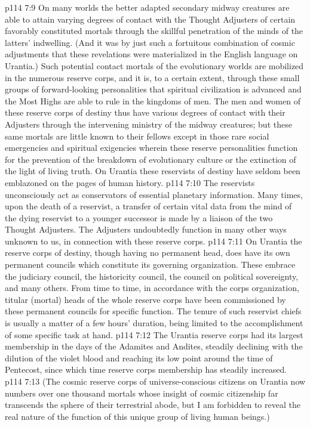 \vs p114 7:9 On many worlds the better adapted secondary midway creatures are able to attain varying degrees of contact with the Thought Adjusters of certain favorably constituted mortals through the skillful penetration of the minds of the latters’ indwelling. (And it was by just such a fortuitous combination of cosmic adjustments that these revelations were materialized in the English language on Urantia.) Such potential contact mortals of the evolutionary worlds are mobilized in the numerous reserve corps, and it is, to a certain extent, through these small groups of forward\hyp{}looking personalities that spiritual civilization is advanced and the Most Highs are able to rule in the kingdoms of men. The men and women of these reserve corps of destiny thus have various degrees of contact with their Adjusters through the intervening ministry of the midway creatures; but these same mortals are little known to their fellows except in those rare social emergencies and spiritual exigencies wherein these reserve personalities function for the prevention of the breakdown of evolutionary culture or the extinction of the light of living truth. On Urantia these reservists of destiny have seldom been emblazoned on the pages of human history.
\vs p114 7:10 The reservists unconsciously act as conservators of essential planetary information. Many times, upon the death of a reservist, a transfer of certain vital data from the mind of the dying reservist to a younger successor is made by a liaison of the two Thought Adjusters. The Adjusters undoubtedly function in many other ways unknown to us, in connection with these reserve corps.
\vs p114 7:11 On Urantia the reserve corps of destiny, though having no permanent head, does have its own permanent councils which constitute its governing organization. These embrace the judiciary council, the historicity council, the council on political sovereignty, and many others. From time to time, in accordance with the corps organization, titular (mortal) heads of the whole reserve corps have been commissioned by these permanent councils for specific function. The tenure of such reservist chiefs is usually a matter of a few hours’ duration, being limited to the accomplishment of some specific task at hand.\plusone
\vs p114 7:12 The Urantia reserve corps had its largest membership in the days of the Adamites and Andites, steadily declining with the dilution of the violet blood and reaching its low point around the time of Pentecost, since which time reserve corps membership has steadily increased.
\pc \vs p114 7:13 (The cosmic reserve corps of universe\hyp{}conscious citizens on Urantia now numbers over one thousand mortals whose insight of cosmic citizenship far transcends the sphere of their terrestrial abode, but I am forbidden to reveal the real nature of the function of this unique group of living human beings.)
